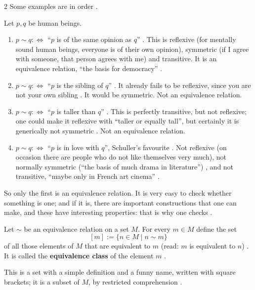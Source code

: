 \begin{paracol}{2}
Some examples are in order .

\begin{example}\label{ex:cl-equiv-ex}
Let $p,q$ be human beings.
\begin{enumerate}
  \item[(a)] $p\sim q:\Leftrightarrow$ ``$p$ is of the same opinion as $q$'' . This is reflexive (for
        mentally sound human beings, everyone is of their own opinion), symmetric (if I agree with someone, that person
        agrees with me) and transitive. It is an equivalence relation, ``the basis for democracy'' .
  \item[(b)] $p\sim q:\Leftrightarrow$ ``$p$ is the sibling of $q$'' . It already fails to be reflexive, since
        you are not your own sibling . It would be symmetric. Not an equivalence relation.
  \item[(c)] $p\sim q:\Leftrightarrow$ ``$p$ is taller than $q$'' . This is perfectly transitive, but not
        reflexive; one could make it reflexive with ``taller or equally tall'', but certainly it is generically not symmetric
        . Not an equivalence relation.
  \item[(d)] $p\sim q:\Leftrightarrow$ ``$p$ is in love with $q$'', Schuller's favourite . Not reflexive (on
        occasion there are people who do not like themselves very much), not normally symmetric (``the basis of much drama in
        literature'') , and not transitive, ``maybe only in French art cinema'' .
\end{enumerate}
So only the first is an equivalence relation. It is very easy to check whether something is one; and if it is, there are
important constructions that one can make, and these have interesting properties: that is why one checks
.
\end{example}

\begin{definition}\label{def:cl-class}
Let $\sim$ be an equivalence relation on a set $M$. For every $m\in M$ define the set
\[
  [m]:=\{n\in M\mid n\sim m\}
\]
of all those elements of $M$ that are equivalent to $m$ (read: $m$ is equivalent to $n$)
. It is called the
\textbf{equivalence class} of the element $m$ .
\end{definition}
This is a set with a simple definition and a funny name, written with square brackets; it is a subset of $M$, by
restricted comprehension .


\end{paracol}
